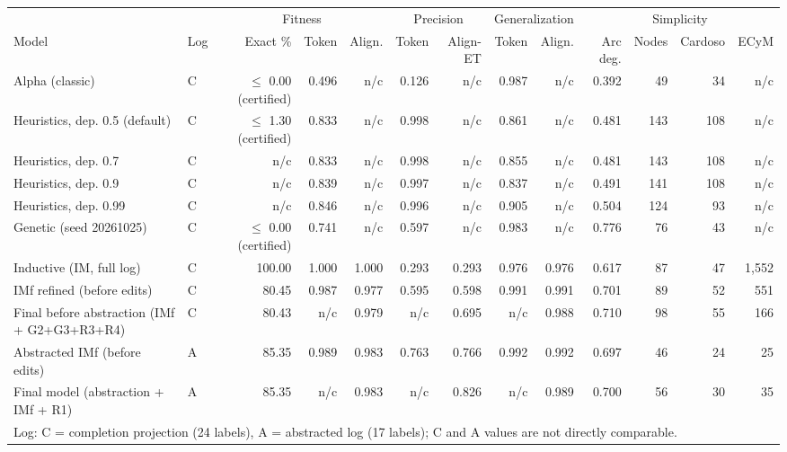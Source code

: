 \begin{tabular}{llrrrrrrrrrrr}
\hline
 & & \multicolumn{3}{c}{Fitness} & \multicolumn{2}{c}{Precision} & \multicolumn{2}{c}{Generalization} & \multicolumn{4}{c}{Simplicity} \\
Model & Log & Exact \% & Token & Align. & Token & Align-ET & Token & Align. & Arc deg. & Nodes & Cardoso & ECyM \\
\hline
Alpha (classic) & C & $\leq$ 0.00 (certified) & 0.496 & n/c & 0.126 & n/c & 0.987 & n/c & 0.392 & 49 & 34 & n/c \\
Heuristics, dep. 0.5 (default) & C & $\leq$ 1.30 (certified) & 0.833 & n/c & 0.998 & n/c & 0.861 & n/c & 0.481 & 143 & 108 & n/c \\
Heuristics, dep. 0.7 & C & n/c & 0.833 & n/c & 0.998 & n/c & 0.855 & n/c & 0.481 & 143 & 108 & n/c \\
Heuristics, dep. 0.9 & C & n/c & 0.839 & n/c & 0.997 & n/c & 0.837 & n/c & 0.491 & 141 & 108 & n/c \\
Heuristics, dep. 0.99 & C & n/c & 0.846 & n/c & 0.996 & n/c & 0.905 & n/c & 0.504 & 124 & 93 & n/c \\
Genetic (seed 20261025) & C & $\leq$ 0.00 (certified) & 0.741 & n/c & 0.597 & n/c & 0.983 & n/c & 0.776 & 76 & 43 & n/c \\
Inductive (IM, full log) & C & 100.00 & 1.000 & 1.000 & 0.293 & 0.293 & 0.976 & 0.976 & 0.617 & 87 & 47 & 1,552 \\
IMf refined (before edits) & C & 80.45 & 0.987 & 0.977 & 0.595 & 0.598 & 0.991 & 0.991 & 0.701 & 89 & 52 & 551 \\
Final before abstraction (IMf + G2+G3+R3+R4) & C & 80.43 & n/c & 0.979 & n/c & 0.695 & n/c & 0.988 & 0.710 & 98 & 55 & 166 \\
Abstracted IMf (before edits) & A & 85.35 & 0.989 & 0.983 & 0.763 & 0.766 & 0.992 & 0.992 & 0.697 & 46 & 24 & 25 \\
Final model (abstraction + IMf + R1) & A & 85.35 & n/c & 0.983 & n/c & 0.826 & n/c & 0.989 & 0.700 & 56 & 30 & 35 \\
\hline
\multicolumn{13}{l}{Log: C = completion projection (24 labels), A = abstracted log (17 labels); C and A values are not directly comparable.} \\
\hline
\end{tabular}
